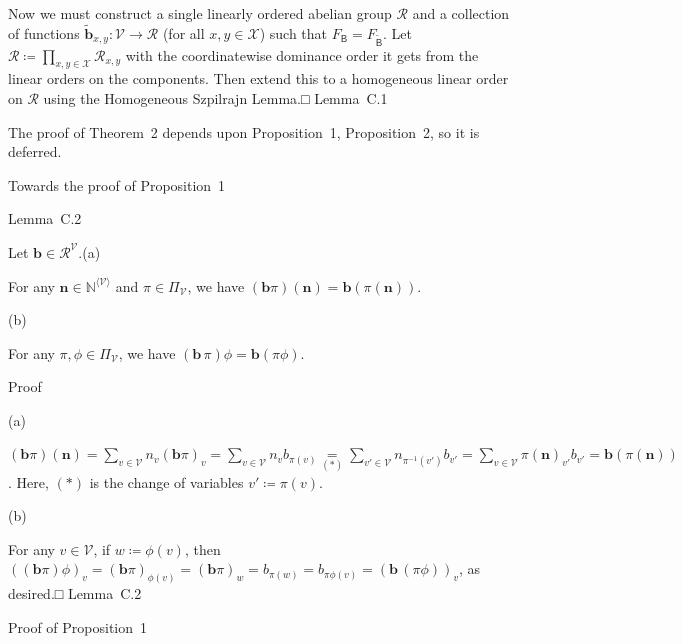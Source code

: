 \documentclass[
]{article}
\begin{document}
Now we must construct a single linearly ordered abelian group
\(\mathcal{R}\) and a collection of functions
\(\left. {\widetilde{\mathbf{b}}}_{x,y}:\mathcal{V}\longrightarrow\mathcal{R} \right.\)
(for all \(x,y \in \mathcal{X}\)) such that
\(F_{\mathsf{B}} = F_{\widetilde{\mathsf{B}}}\). Let
\(\mathcal{R} ≔ \prod_{x,y \in \mathcal{X}}\mathcal{R}_{x,y}\) with the
coordinatewise dominance order it gets from the linear orders on the
components. Then extend this to a homogeneous linear order on
\(\mathcal{R}\) using the Homogeneous Szpilrajn Lemma.□ Lemma~C.1

The proof of Theorem~2 depends upon Proposition~1, Proposition~2, so it
is deferred.

\protect{}\label{s000040}
Towards the proof of Proposition~1

Lemma~C.2

Let \(\mathbf{b} \in \mathcal{R}^{\mathcal{V}}\).(a)

For any \(\mathbf{n} \in \mathbb{N}^{\langle\mathcal{V}\rangle}\) and
\(\pi \in \Pi_{\mathcal{V}}\), we have
\(\left( \mathbf{b}\pi \right)\left( \mathbf{n} \right) = \mathbf{b}\left( \pi\left( \mathbf{n} \right) \right)\).

(b)

For any \(\pi,\phi \in \Pi_{\mathcal{V}}\), we have
\(\left( \mathbf{b}\,\pi \right)\phi = \mathbf{b}(\pi\phi)\).

Proof

(a)

\(\left( \mathbf{b}\pi \right)\left( \mathbf{n} \right) = \sum_{v \in \mathcal{V}}n_{v}\left( \mathbf{b}\pi \right)_{v} = \sum_{v \in \mathcal{V}}n_{v}b_{\pi{(v)}}\underset{( \ast )}{=}\sum_{v' \in \mathcal{V}}n_{\pi^{- 1}{(v')}}b_{v'} = \sum_{v \in \mathcal{V}}\pi\left( \mathbf{n} \right)_{v'}b_{v'} = \mathbf{b}\left( \pi\left( \mathbf{n} \right) \right)\).
Here, \(( \ast )\) is the change of variables \(v' ≔ \pi(v)\).

(b)

For any \(v \in \mathcal{V}\), if \(w ≔ \phi(v)\), then
\(\left( \left( \mathbf{b}\pi \right)\phi \right)_{v} = \left( \mathbf{b}\pi \right)_{\phi{(v)}} = \left( \mathbf{b}\pi \right)_{w} = b_{\pi{(w)}} = b_{\pi\phi{(v)}} = \left( \mathbf{b}\,(\pi\phi) \right)_{v}\),
as desired.□ Lemma~C.2

Proof of Proposition~1
\end{document}
